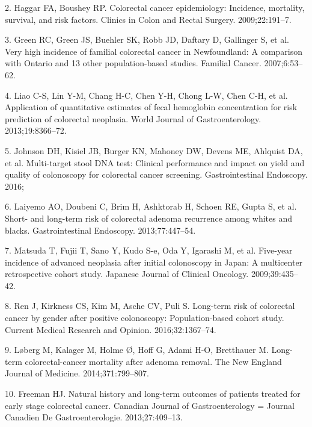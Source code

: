 \documentclass[12pt,]{article}
\begin{document}
\hypertarget{ref-haggar_colorectal_2009}{}
2. Haggar FA, Boushey RP. Colorectal cancer epidemiology: Incidence,
mortality, survival, and risk factors. Clinics in Colon and Rectal
Surgery. 2009;22:191--7.

\hypertarget{ref-green_very_2007}{}
3. Green RC, Green JS, Buehler SK, Robb JD, Daftary D, Gallinger S, et
al. Very high incidence of familial colorectal cancer in Newfoundland: A
comparison with Ontario and 13 other population-based studies. Familial
Cancer. 2007;6:53--62.

\hypertarget{ref-liao_application_2013}{}
4. Liao C-S, Lin Y-M, Chang H-C, Chen Y-H, Chong L-W, Chen C-H, et al.
Application of quantitative estimates of fecal hemoglobin concentration
for risk prediction of colorectal neoplasia. World Journal of
Gastroenterology. 2013;19:8366--72.

\hypertarget{ref-johnson_multi-target_2016}{}
5. Johnson DH, Kisiel JB, Burger KN, Mahoney DW, Devens ME, Ahlquist DA,
et al. Multi-target stool DNA test: Clinical performance and impact on
yield and quality of colonoscopy for colorectal cancer screening.
Gastrointestinal Endoscopy. 2016;

\hypertarget{ref-laiyemo_short-_2013}{}
6. Laiyemo AO, Doubeni C, Brim H, Ashktorab H, Schoen RE, Gupta S, et
al. Short- and long-term risk of colorectal adenoma recurrence among
whites and blacks. Gastrointestinal Endoscopy. 2013;77:447--54.

\hypertarget{ref-matsuda_five-year_2009}{}
7. Matsuda T, Fujii T, Sano Y, Kudo S-e, Oda Y, Igarashi M, et al.
Five-year incidence of advanced neoplasia after initial colonoscopy in
Japan: A multicenter retrospective cohort study. Japanese Journal of
Clinical Oncology. 2009;39:435--42.

\hypertarget{ref-ren_long-term_2016}{}
8. Ren J, Kirkness CS, Kim M, Asche CV, Puli S. Long-term risk of
colorectal cancer by gender after positive colonoscopy: Population-based
cohort study. Current Medical Research and Opinion. 2016;32:1367--74.

\hypertarget{ref-loberg_long-term_2014}{}
9. Løberg M, Kalager M, Holme Ø, Hoff G, Adami H-O, Bretthauer M.
Long-term colorectal-cancer mortality after adenoma removal. The New
England Journal of Medicine. 2014;371:799--807.

\hypertarget{ref-freeman_natural_2013}{}
10. Freeman HJ. Natural history and long-term outcomes of patients
treated for early stage colorectal cancer. Canadian Journal of
Gastroenterology = Journal Canadien De Gastroenterologie.
2013;27:409--13.
\end{document}

